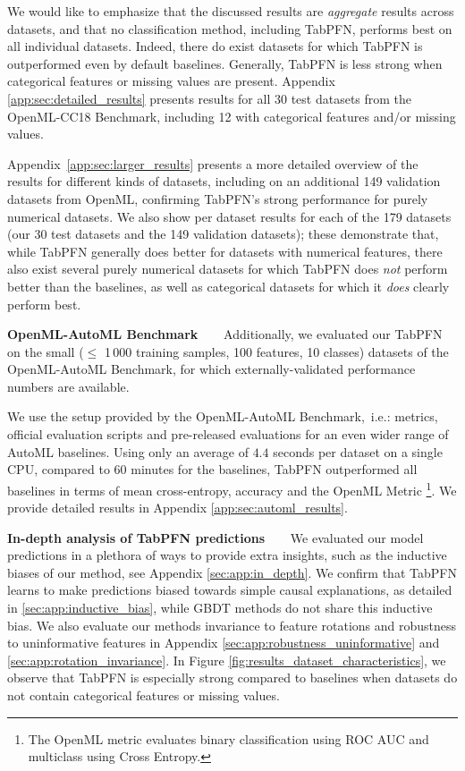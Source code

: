 We would like to emphasize that the discussed results are \emph{aggregate} results across datasets, and that no classification method, including TabPFN, performs best on all individual datasets. Indeed, there do exist datasets for which TabPFN is outperformed even by default baselines. Generally, TabPFN is less strong when categorical features or missing values are present. Appendix \ref{app:sec:detailed_results} presents results for all 30 test datasets from the OpenML-CC18 Benchmark, including 12 with categorical features and/or missing values. 

Appendix~\ref{app:sec:larger_results} presents a more detailed overview of the results for different kinds of datasets, including on an additional 149 validation datasets from OpenML, confirming TabPFN's strong performance for purely numerical datasets. We also show per dataset results for each of the 179 datasets (our 30 test datasets and the 149 validation datasets); these demonstrate that, while TabPFN generally does better for datasets with numerical features, there also exist several purely numerical datasets for which TabPFN does \emph{not} perform better than the baselines, as well as categorical datasets for which it \emph{does} clearly perform best. 

\textbf{OpenML-AutoML Benchmark~~~} Additionally, we evaluated our TabPFN on the small ($\le$ 1\,000 training samples, 100 features, 10 classes) datasets of the OpenML-AutoML Benchmark, for which externally-validated performance numbers are available.  

We use the setup provided by the OpenML-AutoML Benchmark,~i.e.: metrics, official evaluation scripts and pre-released evaluations for an even wider range of AutoML baselines. Using only an average of $4.4$ seconds per dataset on a single CPU, compared to 60 minutes for the baselines, TabPFN outperformed all baselines in terms of mean cross-entropy, accuracy and the OpenML Metric \footnote{The OpenML metric evaluates binary classification using ROC AUC and multiclass using Cross Entropy.}. We provide detailed results in Appendix \ref{app:sec:automl_results}. 

\textbf{In-depth analysis of TabPFN predictions~~~} We evaluated our model predictions in a plethora of ways to provide extra insights, such as the inductive biases of our method, see Appendix \ref{sec:app:in_depth}. We confirm that TabPFN learns to make predictions biased towards simple causal explanations, as detailed in \ref{sec:app:inductive_bias}, while GBDT methods do not share this inductive bias. We also evaluate our method\textquotesingle{}s invariance to feature rotations and robustness to uninformative features in Appendix \ref{sec:app:robustness_uninformative} and \ref{sec:app:rotation_invariance}.
In Figure \ref{fig:results_dataset_characteristics}, we observe that TabPFN is especially strong compared to baselines when datasets do not contain categorical features or missing values.

